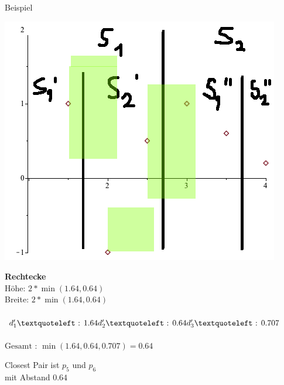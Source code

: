 \documentclass[18pt]{beamer}
\begin{document}
		\begin{frame}{Beispiel}
			\begin{minipage}{0.45\textwidth}
				\includegraphics[width =\textwidth]{logos/PlotsBetter0ggg.png}
			\end{minipage}
			\begin{minipage}{0.45\textwidth}
				\textbf{Rechtecke}\\
				Höhe: $ 2 * \min(1.64, 0.64)$\\ Breite: $2 * \min(1.64, 0.64) $\\
				\ \\
				$d_1'‘ \text{ : }  1.64 \\
				d_2'‘  \text{ : }  0.64 \\
				d_3'‘  \text{ : }  0.707$ \\ 
				\ \\
				$\text{Gesamt  : } \min(1.64, 0.64, 0.707) = 0.64$

				Closest Pair ist $p_5$ und $p_6$ \\ mit Abstand $0.64$
			\end{minipage}
		\end{frame}
\end{document}
